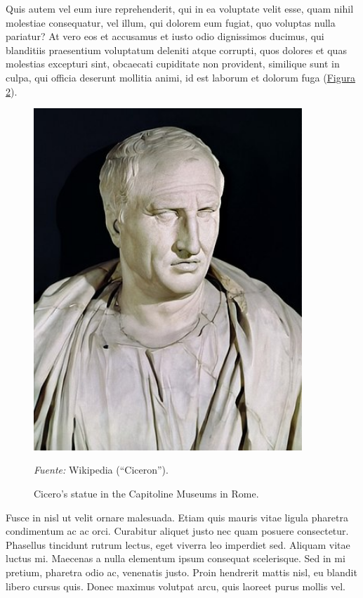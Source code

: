 \documentclass[
    a4paper,%
    DIV=calc,%
    abstract=true%
  ]{scrartcl}%
\newcommand{\source}[1]{\vspace{-9pt}\caption*{\footnotesize{\textit{Fuente:} {#1}}}}
\begin{document}
  Quis autem vel eum iure reprehenderit, qui in ea voluptate velit esse,
  quam nihil molestiae consequatur, vel illum, qui dolorem eum fugiat,
  quo voluptas nulla pariatur? At vero eos et accusamus et iusto odio
  dignissimos ducimus, qui blanditiis praesentium voluptatum deleniti
  atque corrupti, quos dolores et quas molestias excepturi sint,
  obcaecati cupiditate non provident, similique sunt in culpa, qui
  officia deserunt mollitia animi, id est laborum et dolorum fuga
  (\hyperref[FIG_02]{Figura 2}).

  \begin{figure}
  \centering
  \includegraphics[width=0.9\textwidth]{./float/FIG_02}
  \caption{Cicero's statue in the Capitoline Museums in Rome.}
  \source{Wikipedia (“Ciceron”).}
  \label{FIG_02}
  \end{figure}

  Fusce in nisl ut velit ornare malesuada. Etiam quis mauris vitae
  ligula pharetra condimentum ac ac orci. Curabitur aliquet justo nec
  quam posuere consectetur. Phasellus tincidunt rutrum lectus, eget
  viverra leo imperdiet sed. Aliquam vitae luctus mi. Maecenas a nulla
  elementum ipsum consequat scelerisque. Sed in mi pretium, pharetra
  odio ac, venenatis justo. Proin hendrerit mattis nisl, eu blandit
  libero cursus quis. Donec maximus volutpat arcu, quis laoreet purus
  mollis vel.
\end{document}
